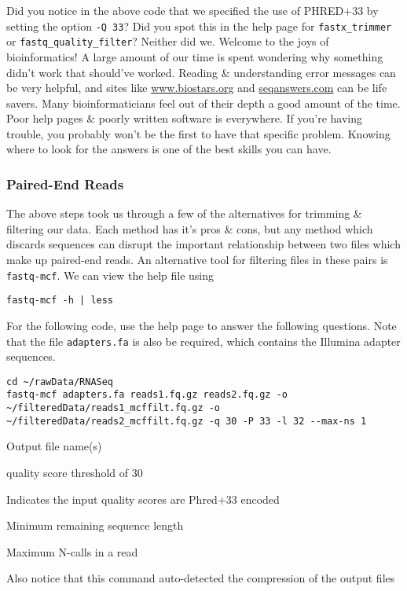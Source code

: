 \begin{advanced}
Did you notice in the above code that we specified the use of PHRED+33 by setting the option \texttt{-Q 33}?
Did you spot this in the help page for \texttt{fastx_trimmer} or \texttt{fastq_quality_filter}?
Neither did we.
Welcome to the joys of bioinformatics!
A large amount of our time is spent wondering why something didn't work that should've worked.
Reading \& understanding error messages can be very helpful, and sites like \url{www.biostars.org} and \url{seqanswers.com} can be life savers.
Many bioinformaticians feel out of their depth a good amount of the time.
Poor help pages \& poorly written software is everywhere.
If you're having trouble, you probably won't be the first to have that specific problem.
Knowing where to look for the answers is one of the best skills you can have.
\end{advanced}


\subsubsection{Paired-End Reads}
\begin{information}
The above steps took us through a few of the alternatives for trimming \& filtering our data.
Each method has it's pros \& cons, but any method which discards sequences can disrupt the important relationship between two files which make up paired-end reads.
An alternative tool for filtering files in these pairs is \texttt{fastq-mcf}.
We can view the help file using
\begin{lstlisting}
fastq-mcf -h | less
\end{lstlisting}
\end{information}

\begin{steps}
For the following code, use the help page to answer the following questions.
Note that the file \texttt{adapters.fa} is also be required, which contains the Illumina adapter sequences.
\begin{lstlisting}
cd ~/rawData/RNASeq
fastq-mcf adapters.fa reads1.fq.gz reads2.fq.gz -o ~/filteredData/reads1_mcffilt.fq.gz -o ~/filteredData/reads2_mcffilt.fq.gz -q 30 -P 33 -l 32 --max-ns 1  
\end{lstlisting}
\end{steps}

\begin{note}
\begin{description}[style=multiline,labelindent=0cm,align=right,leftmargin=0.8\descriptionlabelspace,rightmargin=1.5cm,font=\ttfamily]
\item[-o] Output file name(s)
\item[-q 30] quality score threshold of 30
\item[-P 33] Indicates the input quality scores are Phred+33 encoded
\item[-l 32] Minimum remaining sequence length
\item[--max-ns 1] Maximum N-calls in a read
\end{description}
Also notice that this command auto-detected the compression of the output files
\end{note}

